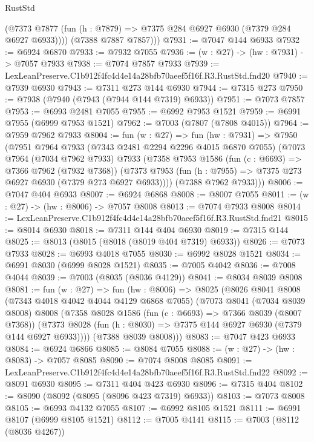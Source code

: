 \begin{lexlean}{RustStd}
\begin{coremodule}
          (@7373 @7877 (fun (h : @7879) => @7375 @284 @6927 @6930 (@7379 @284 @6927 @6933))))
        (@7388 @7887 @7857)))
@7931 := @7047 @144 @6933
@7932 := @6924 @6870
@7933 := @7932 @7055
@7936 := (w : @27) -> (hw : @7931) -> @7057 @7933
@7938 := @7074 @7857 @7933
@7939 := LexLeanPreserve.C1b912f4fc4d4e14a28bfb70aeef5f16f.R3.RustStd.fnd20
@7940 := @7939 @6930
@7943 := @7311 @273 @144 @6930
@7944 := @7315 @273
@7950 := @7938 (@7940 (@7943 (@7944 @144 @7319) @6933))
@7951 := @7073 @7857
@7953 := @6993 @2481 @7055
@7955 := @6992 @7953 @1521
@7959 := @6991 @7955 (@6999 @7953 @1521)
@7962 := @7003 (@7807 (@7808 @4015))
@7964 := @7959 @7962 @7933
@8004 := fun (w : @27) =>
  fun (hw : @7931) =>
  @7950
    (@7951
      @7964
      @7933
      (@7343 @2481 @2294 @2296 @4015 @6870 @7055)
      (@7073
        @7964
        (@7034 @7962 @7933)
        @7933
        (@7358
          @7953
          @1586
          (fun (c : @6693) => @7366 @7962 (@7932 @7368))
          (@7373 @7953 (fun (h : @7955) => @7375 @273 @6927 @6930 (@7379 @273 @6927 @6933))))
        (@7388 @7962 @7933)))
@8006 := @7047 @404 @6933
@8007 := @6924 @6868
@8008 := @8007 @7055
@8011 := (w : @27) -> (hw : @8006) -> @7057 @8008
@8013 := @7074 @7933 @8008
@8014 := LexLeanPreserve.C1b912f4fc4d4e14a28bfb70aeef5f16f.R3.RustStd.fnd21
@8015 := @8014 @6930
@8018 := @7311 @144 @404 @6930
@8019 := @7315 @144
@8025 := @8013 (@8015 (@8018 (@8019 @404 @7319) @6933))
@8026 := @7073 @7933
@8028 := @6993 @4018 @7055
@8030 := @6992 @8028 @1521
@8034 := @6991 @8030 (@6999 @8028 @1521)
@8035 := @7005 @4042
@8036 := @7008 @4044
@8039 := @7003 (@8035 (@8036 @4129))
@8041 := @8034 @8039 @8008
@8081 := fun (w : @27) =>
  fun (hw : @8006) =>
  @8025
    (@8026
      @8041
      @8008
      (@7343 @4018 @4042 @4044 @4129 @6868 @7055)
      (@7073
        @8041
        (@7034 @8039 @8008)
        @8008
        (@7358
          @8028
          @1586
          (fun (c : @6693) => @7366 @8039 (@8007 @7368))
          (@7373 @8028 (fun (h : @8030) => @7375 @144 @6927 @6930 (@7379 @144 @6927 @6933))))
        (@7388 @8039 @8008)))
@8083 := @7047 @423 @6933
@8084 := @6924 @6866
@8085 := @8084 @7055
@8088 := (w : @27) -> (hw : @8083) -> @7057 @8085
@8090 := @7074 @8008 @8085
@8091 := LexLeanPreserve.C1b912f4fc4d4e14a28bfb70aeef5f16f.R3.RustStd.fnd22
@8092 := @8091 @6930
@8095 := @7311 @404 @423 @6930
@8096 := @7315 @404
@8102 := @8090 (@8092 (@8095 (@8096 @423 @7319) @6933))
@8103 := @7073 @8008
@8105 := @6993 @4132 @7055
@8107 := @6992 @8105 @1521
@8111 := @6991 @8107 (@6999 @8105 @1521)
@8112 := @7005 @4141
@8115 := @7003 (@8112 (@8036 @4267))

\end{coremodule}
\end{lexlean}
